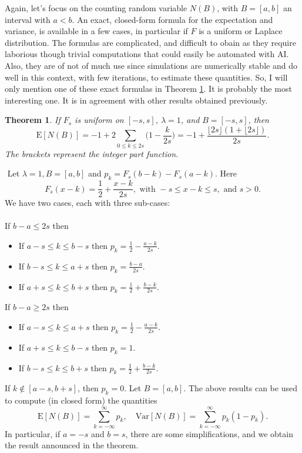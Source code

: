 \documentclass[10pt]{article}
\newtheorem{theorem}{Theorem}[section]
\newenvironment{proof}[1][Proof]{\begin{trivlist}
\item[\hskip \labelsep {\bfseries #1}]}{\end{trivlist}}
\newcommand{\qed}{\nobreak \ifvmode \relax \else
      \ifdim\lastskip<1.5em \hskip-\lastskip
      \hskip1.5em plus0em minus0.5em \fi \nobreak
      \vrule height0.75em width0.5em depth0.25em\fi}
\begin{document}
Again, let's focus on the counting random variable $N(B)$, with $B=[a, b]$ an interval with $a<b$. An exact, closed-form formula for the expectation and variance, is available in a few cases, in particular if $F$ is a uniform or Laplace distribution. The formulas are complicated, and difficult to obain as they require laborious though trivial computations that could easily be automated with AI. Also, they are of not of much use since simulations are \textcolor{index}{numerically stable} and do well in this context, with few iterations, to estimate these quantities. So, I will only mention one of these exact formulas in Theorem \ref{sums6}. It is probably the most interesting one. It is in agreement with other results obtained previously.

\begin{theorem}
\label{sums6}
If $F_s$ is \textcolor{index}{uniform}  on $[-s, s]$, $\lambda=1$, and $B=[-s,s]$, then
$$\mbox{E}[N(B)]= -1+2\sum_{0\leq k\leq 2s}\Big(1-\frac{k}{2s}\Big)=-1+\frac{\lfloor 2s\rfloor(1+\lfloor 2s\rfloor)}{2s}. $$
The brackets represent the integer part function.
 \end{theorem}
\begin{proof}
$ $ \newline
Let $\lambda=1, B=[a, b]$ and $p_k=F_s(b-k)-F_s(a-k)$. Here
$$F_s(x-k)=\frac{1}{2}+\frac{x-k}{2s}, \mbox{ with } -s\leq x-k\leq s, \mbox{ and } s>0.$$
We have two cases, each with three sub-cases: \\ \\
If $b-a\leq 2s$ then
\begin{itemize}
 \item If $a-s\leq k\leq b-s$ then $p_k=\frac{1}{2}-\frac{a-k}{2s}$.
 \item If $b-s\leq k \leq a+s$ then $p_k=\frac{b-a}{2s}$.
 \item If $a+s\leq k \leq b+s$ then $p_k=\frac{1}{2}+\frac{b-k}{2s}$.
\end{itemize}
If $b-a\geq 2s$ then
\begin{itemize}
 \item If $a-s\leq k\leq a+s$ then $p_k=\frac{1}{2}-\frac{a-k}{2s}$.
 \item If $a+s\leq k \leq b-s$ then $p_k=1$.
 \item If $b-s\leq k \leq b+s$ then $p_k=\frac{1}{2}+\frac{b-k}{2s}$.
\end{itemize}
If $k\notin [a-s,b+s]$, then $p_k=0$. Let $B=[a,b]$. The above results can be used to compute (in closed form) the quantities
$$\mbox{E}[N(B)]=\sum_{k=-\infty}^\infty p_k, \quad
\mbox{Var}[N(B)]=\sum_{k=-\infty}^\infty p_k(1-p_k).$$
In particular, if $a=-s$ and $b=s$, there are some simplifications, and we obtain the result announced in the theorem.
\qed
\end{proof}
\end{document}
